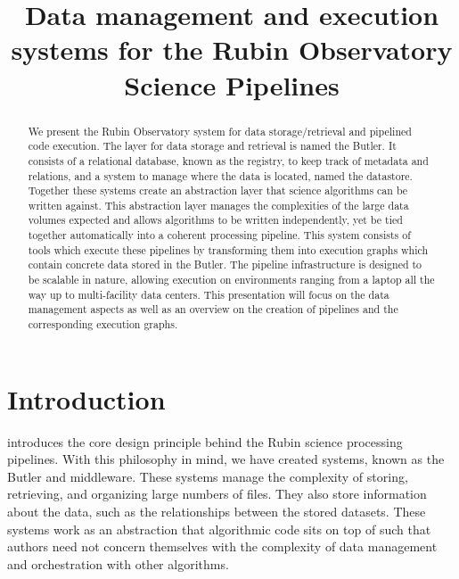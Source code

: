\documentclass[11pt,twoside]{article}
\begin{document}




\title{Data management and execution systems for the Rubin Observatory Science Pipelines}


\begin{abstract}
    We present the Rubin Observatory system for data storage/retrieval and pipelined code execution. The layer for data storage and retrieval is named the Butler. It consists of a relational database, known as the registry, to keep track of metadata and relations, and a system to manage where the data is located, named the datastore. Together these systems create an abstraction layer that science algorithms can be written against. This abstraction layer manages the complexities of the large data volumes expected and allows algorithms to be written independently, yet be tied together automatically into a coherent processing pipeline. This system consists of tools which execute these pipelines by transforming them into execution graphs which contain concrete data stored in the Butler. The pipeline infrastructure is designed to be scalable in nature, allowing execution on environments ranging from a laptop all the way up to multi-facility data centers. This presentation will focus on the data management aspects as well as an overview on the creation of pipelines and the corresponding execution graphs.
\end{abstract}

\section{Introduction}

\citet{I08_adassxxxii} introduces the core design principle behind the Rubin science processing pipelines. With this philosophy in mind, we have created systems, known as the Butler and middleware. These systems manage the complexity of storing, retrieving, and organizing large numbers of files. They also store information about the data, such as the relationships between the stored datasets. These systems work as an abstraction that algorithmic code sits on top of such that authors need not concern themselves with the complexity of data management and orchestration with other algorithms.
\end{document}
